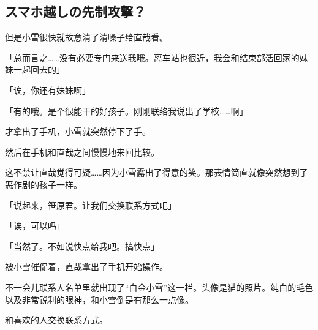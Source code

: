 \subsection{スマホ越しの先制攻撃？}

但是小雪很快就故意清了清嗓子给直哉看。

「总而言之……没有必要专门来送我哦。离车站也很近，我会和结束部活回家的妹妹一起回去的」

「诶，你还有妹妹啊」

「有的哦。是个很能干的好孩子。刚刚联络我说出了学校……啊」

才拿出了手机，小雪就突然停下了手。

然后在手机和直哉之间慢慢地来回比较。

这不禁让直哉觉得可疑……因为小雪露出了得意的笑。那表情简直就像突然想到了恶作剧的孩子一样。

「说起来，笹原君。让我们交换联系方式吧」

「诶，可以吗」

「当然了。不如说快点给我吧。搞快点」

被小雪催促着，直哉拿出了手机开始操作。

不一会儿联系人名单里就出现了“白金小雪”这一栏。头像是猫的照片。纯白的毛色以及非常锐利的眼神，和小雪倒是有那么一点像。

和喜欢的人交换联系方式。

